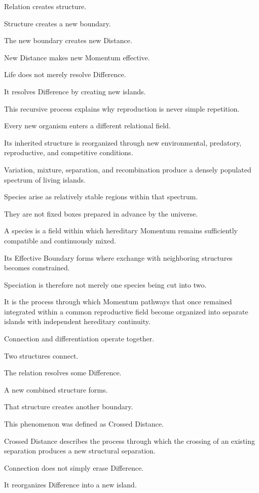 Relation creates structure.

Structure creates a new boundary.

The new boundary creates new Distance.

New Distance makes new Momentum effective.

Life does not merely resolve Difference.

It resolves Difference by creating new islands.

This recursive process explains why reproduction is never simple repetition.

Every new organism enters a different relational field.

Its inherited structure is reorganized through new environmental, predatory, reproductive, and competitive conditions.

Variation, mixture, separation, and recombination produce a densely populated spectrum of living islands.

Species arise as relatively stable regions within that spectrum.

They are not fixed boxes prepared in advance by the universe.

A species is a field within which hereditary Momentum remains sufficiently compatible and continuously mixed.

Its Effective Boundary forms where exchange with neighboring structures becomes constrained.

Speciation is therefore not merely one species being cut into two.

It is the process through which Momentum pathways that once remained integrated within a common reproductive field become organized into separate islands with independent hereditary continuity.

Connection and differentiation operate together.

Two structures connect.

The relation resolves some Difference.

A new combined structure forms.

That structure creates another boundary.

This phenomenon was defined as Crossed Distance.

Crossed Distance describes the process through which the crossing of an existing separation produces a new structural separation.

Connection does not simply erase Difference.

It reorganizes Difference into a new island.

